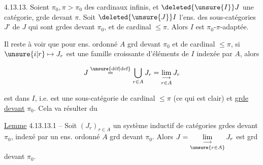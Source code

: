 
 4.13.13. Soient $\pi_0,\pi>\pi_0$ des cardinaux infinis,  et $\deleted{\unsure{I}}J$ une  catégorie, grde devant $\pi$. Soit $\deleted{\unsure{J}}I$ l'ens. des sous-catégories $J'$ de $J$  qui sont grdes devant $\pi_0$, et de cardinal $\leq\pi$. Alors $I$ est $\pi_0$-$\pi$-adaptée.

Il reste à voir que pour  ens. ordonné $A$ grd devant $\pi_0$ et de cardinal $\leq\pi$, si $\unsure{i|r}\mapsto J_r$ est une famille croissante d'éléments de $I$ indexée par $A$, alors

\[
J\overset{\text{\unsure{déf|def}}}{=}\bigcup_{r\in A}J_r=\underset{r\in A}{\underset{\longrightarrow}{\lim}}\,J_r
\]

est dans $I$, i.e. est une sous-catégorie  de cardinal $\leq\pi$ (ce qui est clair) et \uline{grde devant} $\pi_0$. Cela va résulter du

\uline{Lemme} 4.13.13.1 -- Soit $(J_r)_{r\in A}$ un système inductif de catégories grdes devant $\pi_0$, indexé par un ens. ordonné $A$ grd devant $\pi_0$. Alors $J=\underset{\unsure{r\in A}}{\underset{\longrightarrow}{\lim}}\,J_r$ est grd devant $\pi_0$.

